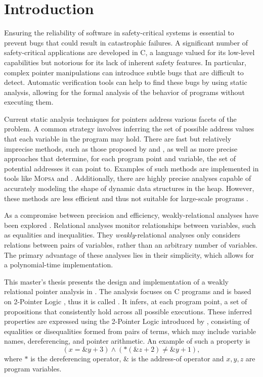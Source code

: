 
\chapter{Introduction}\label{chapter:introduction}

Ensuring the reliability of software in safety-critical systems is essential to prevent bugs that could result in catastrophic failures.
A significant number of safety-critical applications are developed in C, a language valued for its low-level capabilities but notorious for its lack of inherent safety features.
In particular, complex pointer manipulations can introduce subtle bugs that are difficult to detect.
Automatic verification tools can help to find these bugs by using static analysis,
allowing for the formal analysis of the behavior of programs without executing them.

Current static analysis techniques for pointers address various facets of the problem.
A common strategy involves inferring the set of possible address values that each variable in the program may hold.
There are fast but relatively imprecise methods, such as those proposed by \textcite{Steensgaard} and \textcite{Andersen}, as well as more precise approaches that determine, for each program point and variable, the set of potential addresses it can point to.
Examples of such methods are implemented in tools like \textsc{Mopsa} \cite{mopsa} and \goblint \cite{goblint}.
Additionally, there are highly precise analyses capable of accurately modeling the shape of dynamic data structures in the heap.
However, these methods are less efficient and thus not suitable for large-scale programs \cite{rivalpapers,kreiker,predator}.

As a compromise between precision and efficiency,
weakly-relational analyses have been explored \cite{octagon,SeidlETS2023}.
Relational analyses monitor relationships between variables, such as equalities and inequalities.
They \emph{weakly}-relational analyses only considers relations between pairs of variables, rather than an arbitrary number of variables.
The primary advantage of these analyses lies in their simplicity, which allows for a polynomial-time implementation.

This master's thesis presents the design and implementation of a weakly relational pointer analysis in \goblint.
The analysis focuses on C programs and is based on 2-Pointer Logic \cite{2pointer}, thus it is called \cpo.
It infers, at each program point, a set of propositions that consistently hold across all possible executions.
These inferred properties are expressed using the 2-Pointer Logic introduced by \textcite{2pointer},
consisting of equalities or disequalities formed from pairs of terms,
which may include variable names, dereferencing, and pointer arithmetic.
An example of such a property is 
\begin{equation}\label{example:introduction}
    (x = \&y + 3) \land (*(\&z + 2) \neq \&y + 1),
\end{equation}
where $*$ is the dereferencing operator, $\&$ is the address-of operator and $x,y,z$ are program variables.

